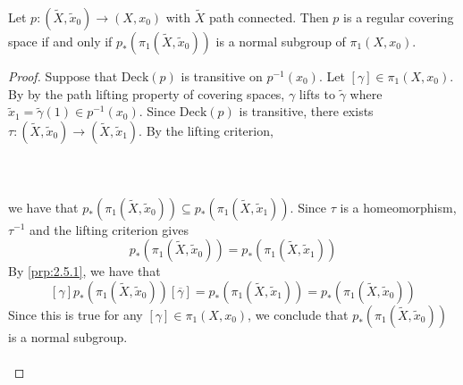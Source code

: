 \documentclass[a4paper]{article}
\begin{document}
\begin{prp}{}{} Let $p:(\tilde{X},\tilde{x}_0)\to (X,x_0)$ with $\tilde{X}$ path connected. Then $p$ is a regular covering space if and only if $p_\ast(\pi_1(\tilde{X},\tilde{x}_0))$ is a normal subgroup of $\pi_1(X,x_0)$. \tcbline
\begin{proof}
Suppose that $\text{Deck}(p)$ is transitive on $p^{-1}(x_0)$. Let $[\gamma]\in\pi_1(X,x_0)$. By by the path lifting property of covering spaces, $\gamma$ lifts to $\tilde{\gamma}$ where $\tilde{x}_1=\tilde{\gamma}(1)\in p^{-1}(x_0)$. Since $\text{Deck}(p)$ is transitive, there exists $\tau:(\tilde{X},\tilde{x}_0)\to(\tilde{X},\tilde{x}_1)$. By the lifting criterion, \\~\\
\\~\\
we have that $p_\ast(\pi_1(\tilde{X},\tilde{x}_0))\subseteq p_\ast(\pi_1(\tilde{X},\tilde{x}_1))$. Since $\tau$ is a homeomorphism, $\tau^{-1}$ and the lifting criterion gives $$p_\ast(\pi_1(\tilde{X},\tilde{x}_0))=p_\ast(\pi_1(\tilde{X},\tilde{x}_1))$$ By \ref{prp:2.5.1}, we have that $$[\gamma]p_\ast(\pi_1(\tilde{X},\tilde{x}_0))[\overline{\gamma}]=p_\ast(\pi_1(\tilde{X},\tilde{x}_1))=p_\ast(\pi_1(\tilde{X},\tilde{x}_0))$$ Since this is true for any $[\gamma]\in\pi_1(X,x_0)$, we conclude that $p_\ast(\pi_1(\tilde{X},\tilde{x}_0))$ is a normal subgroup. \\~\\


\end{proof}
\end{prp}
\end{document}
